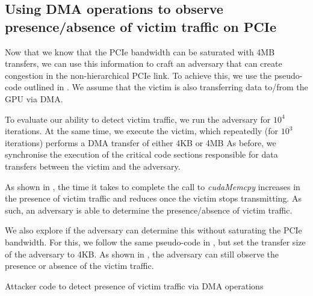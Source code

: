 \subsection{Using DMA operations to observe presence/absence of victim traffic on PCIe}
\label{subsec:interconnect-sc-dma-evaluation}

Now that we know that the PCIe bandwidth can be saturated with 4MB transfers, we can use this information to craft an adversary that can create congestion in the non-hierarchical PCIe link.
To achieve this, we use the pseudo-code outlined in .
We assume that the victim is also transferring data to/from the GPU via DMA.

To evaluate our ability to detect victim traffic, we run the adversary for $10^4$ iterations.
At the same time, we execute the victim, which repeatedly (for $10^3$ iterations) performs a DMA transfer of either 4KB or 4MB
As before, we synchronise the execution of the critical code sections responsible for data transfers between the victim and the adversary. 

As shown in , the time it takes to complete the call to \textit{cudaMemcpy} increases in the presence of victim traffic and reduces once the victim stops transmitting.
As such, an adversary is able to determine the presence/absence of victim traffic.

We also explore if the adversary can determine this without saturating the PCIe bandwidth.
For this, we follow the same pseudo-code in , but set the transfer size of the adversary to 4KB.
As shown in , the adversary can still observe the presence or absence of the victim traffic.


\begin{minipage}{\textwidth}
    
    \captionsetup{type=lstlisting}
    \caption{Attacker code to detect presence of victim traffic via DMA operations}
    \label{lst:timing-victim-with-dma}
\end{minipage}

